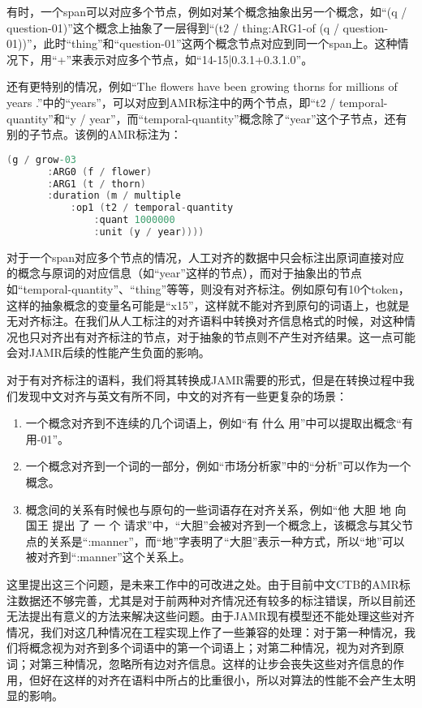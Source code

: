 \documentclass[master, winfont]{njuthesis}
\begin{document}
有时，一个span可以对应多个节点，例如对某个概念抽象出另一个概念，如“(q / question-01)”这个概念上抽象了一层得到“(t2 / thing:ARG1-of (q / question-01))”，此时“thing”和“question-01”这两个概念节点对应到同一个span上。这种情况下，用“+”来表示对应多个节点，如“14-15|0.3.1+0.3.1.0”。

还有更特别的情况，例如“The flowers have been growing thorns for millions of years .”中的“years”，可以对应到AMR标注中的两个节点，即“t2 / temporal-quantity”和“y / year”，而“temporal-quantity”概念除了“year”这个子节点，还有别的子节点。该例的AMR标注为：
\begin{lstlisting}[language=C]
   (g / grow-03
       :ARG0 (f / flower)
       :ARG1 (t / thorn)
       :duration (m / multiple
           :op1 (t2 / temporal-quantity
               :quant 1000000
               :unit (y / year))))
\end{lstlisting}
                        
对于一个span对应多个节点的情况，人工对齐的数据中只会标注出原词直接对应的概念与原词的对应信息（如“year”这样的节点），而对于抽象出的节点如“temporal-quantity”、“thing”等等，则没有对齐标注。例如原句有10个token，这样的抽象概念的变量名可能是“x15”，这样就不能对齐到原句的词语上，也就是无对齐标注。在我们从人工标注的对齐语料中转换对齐信息格式的时候，对这种情况也只对齐出有对齐标注的节点，对于抽象的节点则不产生对齐结果。这一点可能会对JAMR后续的性能产生负面的影响。

对于有对齐标注的语料，我们将其转换成JAMR需要的形式，但是在转换过程中我们发现中文对齐与英文有所不同，中文的对齐有一些更复杂的场景：

\begin{enumerate}
	\item 一个概念对齐到不连续的几个词语上，例如“有 什么 用”中可以提取出概念“有用-01”。
	\item 一个概念对齐到一个词的一部分，例如“市场分析家”中的“分析”可以作为一个概念。
	\item 概念间的关系有时候也与原句的一些词语存在对齐关系，例如“他 大胆 地 向 国王 提出 了 一 个 请求”中，“大胆”会被对齐到一个概念上，该概念与其父节点的关系是“:manner”，而“地”字表明了“大胆”表示一种方式，所以“地”可以被对齐到“:manner”这个关系上。
\end{enumerate}

这里提出这三个问题，是未来工作中的可改进之处。由于目前中文CTB的AMR标注数据还不够完善，尤其是对于前两种对齐情况还有较多的标注错误，所以目前还无法提出有意义的方法来解决这些问题。由于JAMR现有模型还不能处理这些对齐情况，我们对这几种情况在工程实现上作了一些兼容的处理：对于第一种情况，我们将概念视为对齐到多个词语中的第一个词语上；对第二种情况，视为对齐到原词；对第三种情况，忽略所有边对齐信息。这样的让步会丧失这些对齐信息的作用，但好在这样的对齐在语料中所占的比重很小，所以对算法的性能不会产生太明显的影响。
\end{document}
